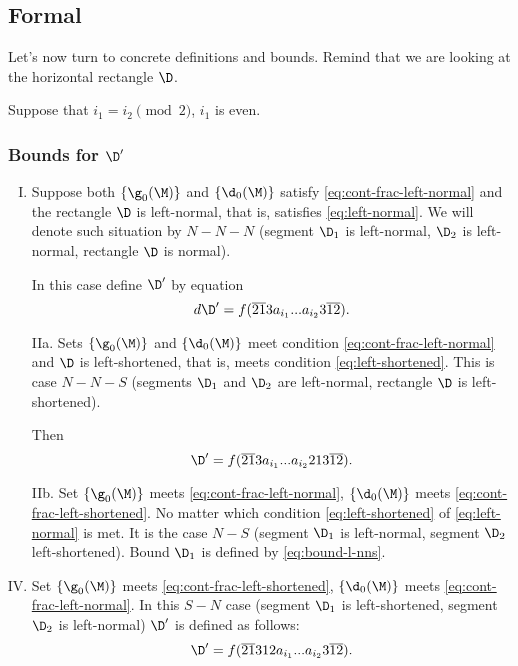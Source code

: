 \subsection{Formal}
\label{sbsc:boundaries_formal}

Let's now turn to concrete definitions and bounds.
Remind that we are looking at the horizontal rectangle $\D$.

Suppose that $i_1 = i_2 \pmod 2$, $i_1$ is even.

\subsubsection{Bounds for $\D'$}

\begin{enumerate}[I.]
	\item Suppose both $\{\g_0(\M)\}$ and $\{\d_0(\M)\}$
	satisfy \ref{eq:cont-frac-left-normal} and the rectangle $\D$ is left-normal,
	that is, satisfies \ref{eq:left-normal}.
	We will denote such situation by $N-N-N$
	(segment $\D_1$ is left-normal, $\D_2$ is left-normal, rectangle $\D$ is normal).
	
	In this case define $\D'$ by equation
	\begin{equation}d
		\D' = f(\overline{21}3a_{i_1}... a_{i_2}3\overline{12}).
	\end{equation}
	
	\item[IIa.] Sets $\{\g_0(\M)\}$ and $\{\d_0(\M)\}$
	meet condition \ref{eq:cont-frac-left-normal}
	and $\D$ is left-shortened, that is, meets condition \ref{eq:left-shortened}.
	This is case $N-N-S$
	(segments $\D_1$ and $\D_2$ are left-normal, rectangle $\D$ is left-shortened).
	
	Then
	\begin{equation}\label{eq:bound-l-nns}
		\D' = f(\overline{21}3a_{i_1}... a_{i_2}213\overline{12}).
	\end{equation}
	
	\item[IIb.] Set $\{\g_0(\M)\}$ meets \ref{eq:cont-frac-left-normal},
	$\{\d_0(\M)\}$ meets \ref{eq:cont-frac-left-shortened}.
	No matter which condition \ref{eq:left-shortened} of \ref{eq:left-normal} is met.
	It is the case $N-S$
	(segment $\D_1$ is left-normal, segment $\D_2$ left-shortened).
	Bound $\D_1$ is defined by \ref{eq:bound-l-nns}.
	
	\addtocounter{enumi}{1}
	\item Set $\{\g_0(\M)\}$ meets \ref{eq:cont-frac-left-shortened},
	$\{\d_0(\M)\}$ meets \ref{eq:cont-frac-left-normal}.
	In this $S-N$ case
	(segment $\D_1$ is left-shortened, segment $\D_2$ is left-normal)
	$\D'$ is defined as follows:
	\begin{equation}
		\D' = f(\overline{21}312a_{i_1}... a_{i_2}3\overline{12}).
	\end{equation}
	

\end{enumerate}
